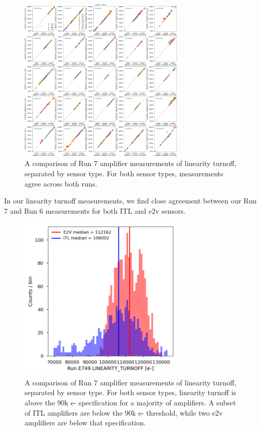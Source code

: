\begin{figure}[H]
\begin{centering}
\includegraphics[width=0.7\textwidth]{figures/baselineCharacterization/13591_E749_LINEARITY_TURNOFF.png}
\caption{A comparison of Run 7 amplifier measurements of linearity turnoff, separated by sensor type. For both sensor types, measurements agree across both runs.}
\end{centering}
\end{figure}

In our linearity turnoff measurements, we find close agreement between
our Run 7 and Run 6 measurements for both ITL and e2v sensors.

\begin{figure}[H]
\begin{centering}
\includegraphics[width=0.7\textwidth]{figures/baselineCharacterization/LINEARITY_TURNOFF_E749_sensorType.png}
\caption{A comparison of Run 7 amplifier measurements of linearity turnoff, separated by sensor type. For both sensor types, linearity turnoff is above the 90k e- specification for a majority of amplifiers. A subset of ITL amplifiers are below the 90k e- threshold, while two e2v amplifiers are below that specification.}
\end{centering}
\end{figure}

